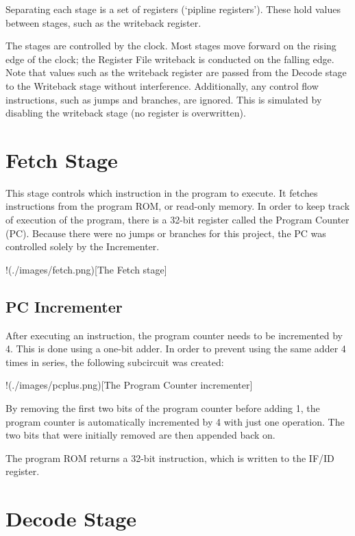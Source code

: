Separating each stage is a set of registers (`pipline registers'). These
hold values between stages, such as the writeback register.

The stages are controlled by the clock. Most stages move forward on the
rising edge of the clock; the Register File writeback is conducted on
the falling edge. Note that values such as the writeback register are
passed from the Decode stage to the Writeback stage without
interference. Additionally, any control flow instructions, such as jumps
and branches, are ignored. This is simulated by disabling the writeback
stage (no register is overwritten).

\section{Fetch Stage}\label{fetch-stage}

This stage controls which instruction in the program to execute. It
fetches instructions from the program ROM, or read-only memory. In order
to keep track of execution of the program, there is a 32-bit register
called the Program Counter (PC). Because there were no jumps or branches
for this project, the PC was controlled solely by the Incrementer.

!(./images/fetch.png){[}The Fetch stage{]}

\subsection{PC Incrementer}\label{pc-incrementer}

After executing an instruction, the program counter needs to be
incremented by 4. This is done using a one-bit adder. In order to
prevent using the same adder 4 times in series, the following subcircuit
was created:

!(./images/pcplus.png){[}The Program Counter incrementer{]}

By removing the first two bits of the program counter before adding 1,
the program counter is automatically incremented by 4 with just one
operation. The two bits that were initially removed are then appended
back on.

The program ROM returns a 32-bit instruction, which is written to the
IF/ID register.

\section{Decode Stage}\label{decode-stage}


